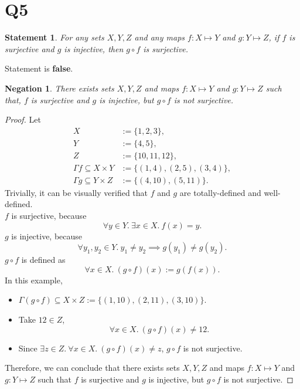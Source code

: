 \documentclass[12pt]{article}
\newtheorem*{stmt}{Statement}
\newtheorem*{negstmt}{Negation}
\begin{document}
\section*{Q5}
\begin{stmt}
    For any sets $X,Y,Z$ and any maps $f:X\mapsto Y$ and $g:Y\mapsto Z$,
    if $f$ is surjective and $g$ is injective, then $g\circ f$ is surjective.
\end{stmt}
Statement is \textbf{false}.
\begin{negstmt}
    There exists sets $X,Y,Z$ and maps $f:X\mapsto Y$ and $g:Y\mapsto Z$ such that,
    $f$ is surjective and $g$ is injective, but $g \circ f$ is not surjective.
\end{negstmt}
\begin{proof}
    Let
    \begin{align*}
        X &:= \{1, 2, 3\},\\
        Y &:=\{4, 5\},\\
        Z &:=\{10, 11, 12\},\\
        \Gamma f \subseteq X\times Y &:=\{(1,4),(2,5),(3,4)\},\\
        \Gamma g \subseteq Y\times Z &:=\{(4,10), (5,11)\}.
    \end{align*}
    Trivially, it can be visually verified that $f$ and $g$ are totally-defined and well-defined.\\
    $f$ is surjective, because
        $$\forall y \in Y.~ \exists x \in X.~ f(x) = y.$$
    $g$ is injective, because
        $$\forall y_1,y_2 \in Y.~ y_1 \neq y_2 \implies g(y_1) \neq g(y_2).$$
    $g\circ f$ is defined as $$\forall x \in X.~ (g\circ f)(x) := g(f(x)).$$
    In this example,
    \begin{itemize}[label={}]
        \item $\Gamma (g \circ f) \subseteq X \times Z := \{(1,10),(2,11),(3,10)\}$.
        \item Take $12 \in Z$,
            $$\forall x \in X.~ (g \circ f)(x) \neq 12.$$
        \item Since $\exists z \in Z.~ \forall x \in X.~ (g \circ f)(x) \neq z$,
            $g \circ f$ is not surjective.
    \end{itemize}
    Therefore, we can conclude that there exists sets $X,Y,Z$ and maps $f:X\mapsto Y$ and $g:Y\mapsto Z$ such that $f$ is surjective and $g$ is injective, but $g \circ f$ is not surjective.
\end{proof}
\newpage
\end{document}
